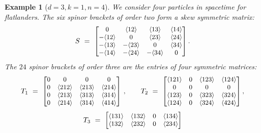 \documentclass[english]{ourlematema}
\numberwithin{theorem}{section}
\newtheorem{example}[theorem]{Example}
\theoremstyle{definition}
\begin{document}
\begin{example}[$d=3,k=1,n=4$] \label{ex:flatlanders}
We consider four particles in spacetime for flatlanders.
The six spinor brackets of order two form a skew symmetric matrix:
$$
S \,\,=\,\,  \begin{small} \begin{bmatrix}
0  & \langle 12 \rangle & \langle 13 \rangle & \langle 14 \rangle \\
 -\langle 12 \rangle & 0  & \langle 23 \rangle & \langle 24 \rangle \\
 -\langle 13 \rangle & -\langle 23 \rangle & 0  & \langle 34 \rangle \\
 -\langle 14 \rangle & -\langle 24 \rangle & -\langle 34 \rangle & 0  \\
\end{bmatrix}. \end{small}
$$
The $24$ spinor brackets of order three are the entries of 
four symmetric matrices:
$$
T_1 \,\,=\,\, \begin{small}
\begin{bmatrix}
0  & 0  & 0  & 0  \\
 0  & \langle 212 \rangle & \langle 213 \rangle & \langle 214 \rangle \\
 0  & \langle 213 \rangle & \langle 313 \rangle & \langle 314 \rangle \\
 0  & \langle 214 \rangle & \langle 314 \rangle & \langle 414 \rangle \\
\end{bmatrix} \end{small} \, , \qquad
T_2 \,\,=\,\,  \begin{small}
\begin{bmatrix}
 \langle 121 \rangle & 0  & \langle 123 \rangle & \langle 124 \rangle \\
 0  & 0  & 0  & 0  \\
 \langle 123 \rangle & 0  & \langle 323 \rangle & \langle 324 \rangle \\
 \langle 124 \rangle & 0  & \langle 324 \rangle & \langle 424 \rangle \\
\end{bmatrix}, \end{small}
$$
$$ T_3 \,\,=\,\,  \begin{small}
\begin{bmatrix} 
\langle 131 \rangle & \langle 132 \rangle & 0  & \langle 134 \rangle \\
 \langle 132 \rangle & \langle 232 \rangle & 0  & \langle 234 \rangle \\

\end{bmatrix}
\end{small}$$
\end{example}
\end{document}
